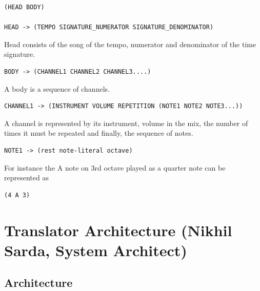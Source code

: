 \documentclass[letterpaper,11pt]{article}
\begin{document}
{\lstset{breaklines=true,language=Lisp}
\begin{lstlisting}
(HEAD BODY)

HEAD -> (TEMPO SIGNATURE_NUMERATOR SIGNATURE_DENOMINATOR)
\end{lstlisting}

Head consists of the song of the tempo, numerator and denominator of the time signature.

\lstset{breaklines=true,language=Lisp}
\begin{lstlisting}
BODY -> (CHANNEL1 CHANNEL2 CHANNEL3....)

\end{lstlisting}
A body is a sequence of channels.

\lstset{breaklines=true,language=Lisp}
\begin{lstlisting}
CHANNEL1 -> (INSTRUMENT VOLUME REPETITION (NOTE1 NOTE2 NOTE3...))

\end{lstlisting}
A channel is represented by its instrument, volume in the mix, the number of times it must be repeated and finally, the sequence of notes.

\lstset{breaklines=true,language=Lisp}
\begin{lstlisting}
NOTE1 -> (rest note-literal octave)

\end{lstlisting}
For instance the A note on 3rd octave played as a quarter note can be
represented as

\lstset{breaklines=true,language=Lisp}
\begin{lstlisting}
(4 A 3)
\end{lstlisting}

\section{Translator Architecture (Nikhil Sarda, System Architect)}
\subsection{Architecture}

}
\end{document}
